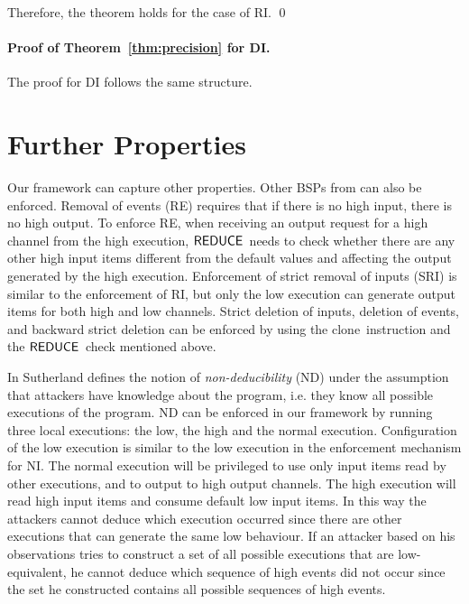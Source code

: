 \documentclass[10pt,a4paper,oneside]{article}
\def\sanserif#1{\ensuremath{\sf #1}}
\def\REDUCE{\ensuremath{\sanserif{REDUCE}}}
\def\NCLONE{clone}
\begin{document}
Therefore, the theorem holds for the case of RI. \qed



\paragraph{Proof of Theorem~\ref{thm:precision} for DI.}
The proof for DI follows the same structure.



\section{Further Properties}\label{sec:discussion}

Our framework can capture other properties. Other BSPs from \cite{MANT-00-CSF} can also be enforced. Removal of events (RE) requires that if there is no high input, there is no high output. To enforce RE, when receiving an output request for a high channel from the high execution, \REDUCE\ needs to check whether there are any other high input items different from the default values and affecting the output generated by the high execution. Enforcement of strict removal of inputs (SRI) is similar to the enforcement of RI, but only the low execution can generate output items for both high and low channels. Strict deletion of inputs, deletion of events, and backward strict deletion can be enforced by using the \NCLONE\ instruction and the \REDUCE\ check mentioned above.


In \cite{Suth-86-SP} Sutherland defines the notion of \emph{non-deducibility} (ND) under the assumption that attackers have knowledge about the program, i.e. they know all possible executions of the program. ND can be enforced in our framework by running three local executions: the low, the high and the normal execution. Configuration of the low execution is similar to the low execution in the enforcement mechanism for NI. The normal execution will be privileged to use only input items read by other executions, and to output to high output channels. The high execution will read high input items and consume default low input items. In this way the attackers cannot deduce which execution occurred since there are other executions that can generate the same low behaviour. If an attacker based on his observations tries to construct a set of all possible executions that are low-equivalent, he cannot deduce which sequence of high events did not occur since the set he constructed contains all possible sequences of high events.
\end{document}
